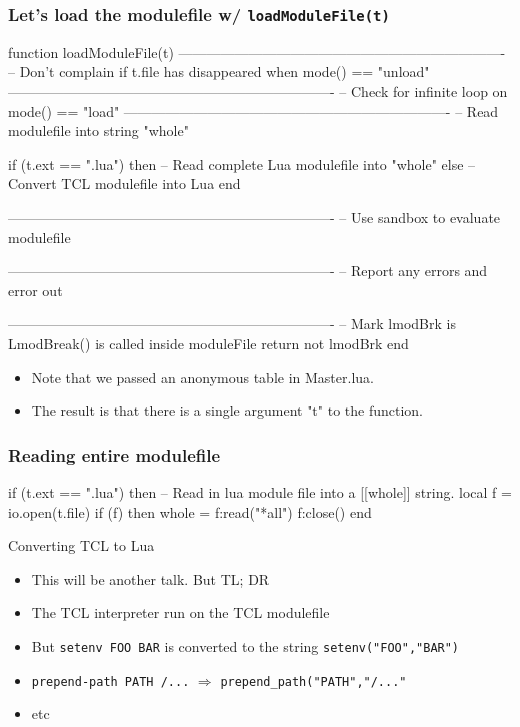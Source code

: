 \documentclass{beamer}
\begin{document}
\begin{frame}[fragile]
    \frametitle{Let's load the modulefile w/ \texttt{loadModuleFile(t)}}
 {\tiny
    \begin{semiverbatim}
function loadModuleFile(t)
   ----------------------------------------------------------------------
   -- Don't complain if t.file has disappeared when mode() == "unload"
   ----------------------------------------------------------------------
   -- Check for infinite loop on mode() == "load"
   ----------------------------------------------------------------------
   -- Read modulefile into string "whole"

   if (t.ext == ".lua") then
      -- Read complete Lua modulefile into "whole"
   else
      -- Convert TCL modulefile into Lua
   end

   ----------------------------------------------------------------------
   -- Use sandbox to evaluate modulefile

   ----------------------------------------------------------------------
   -- Report any errors and error out

   ----------------------------------------------------------------------
   -- Mark lmodBrk is LmodBreak() is called inside moduleFile
   return not lmodBrk
end
    \end{semiverbatim}
}
  \begin{itemize}
    \item Note that we passed an anonymous table in Master.lua.   
    \item The result is that there is a single argument "t" to the function.
  \end{itemize}
\end{frame}

\begin{frame}[fragile]
    \frametitle{Reading entire modulefile}
 {\tiny
    \begin{semiverbatim}
    if (t.ext == ".lua") then
      -- Read in lua module file into a [[whole]] string.
      local f = io.open(t.file)
      if (f) then
         whole = f:read("*all")
         f:close()
      end
   \end{semiverbatim}
}
\end{frame}

\begin{frame}{Converting TCL to Lua} 
  \begin{itemize}
    \item This will be another talk. But TL; DR
    \item The TCL interpreter run on the TCL modulefile
    \item But \texttt{setenv FOO BAR} is converted to the string
      \texttt{setenv("FOO","BAR")}
    \item \texttt{prepend-path PATH /...} $\Rightarrow$
      \texttt{prepend\_path("PATH","/..."}
    \item etc
  \end{itemize}
\end{frame}
\end{document}
